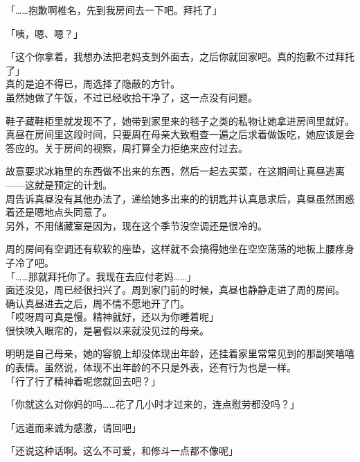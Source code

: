 「……抱歉啊椎名，先到我房间去一下吧。拜托了」

「咦，嗯、嗯？」

「这个你拿着，我想办法把老妈支到外面去，之后你就回家吧。真的抱歉不过拜托了」\\

真的是迫不得已，周选择了隐蔽的方针。\\

虽然她做了午饭，不过已经收拾干净了，这一点没有问题。

鞋子藏鞋柜里就发现不了，她带到家里来的毯子之类的私物让她拿进房间里就好。\\

真昼在房间里这段时间，只要周在母亲大致粗查一遍之后求着做饭吃，她应该是会答应的。关于房间的视察，周打算全力拒绝来应付过去。

故意要求冰箱里的东西做不出来的东西，然后一起去买菜，在这期间让真昼逃离——这就是预定的计划。\\

周告诉真昼没有其他办法了，递给她多出来的的钥匙并认真恳求后，真昼虽然困惑着还是嗯地点头同意了。\\

另外，不用储藏室是因为，现在这个季节没空调还是很冷的。

周的房间有空调还有软软的座垫，这样就不会搞得她坐在空空荡荡的地板上腰疼身子冷了吧。\\

「……那就拜托你了。我现在去应付老妈……」\\

面还没见，周已经很扫兴了。周到家门前的时候，真昼也静静走进了周的房间。\\

确认真昼进去之后，周不情不愿地开了门。\\

「哎呀周可真是慢。精神就好，还以为你睡着呢」\\

很快映入眼帘的，是暑假以来就没见过的母亲。

明明是自己母亲，她的容貌上却没体现出年龄，还挂着家里常常见到的那副笑嘻嘻的表情。虽然说，体现不出年龄的不只是外表，还有行为也是一样。\\

「行了行了精神着呢您就回去吧？」

「你就这么对你妈的吗……花了几小时才过来的，连点慰劳都没吗？」

「远道而来诚为感激，请回吧」

「还说这种话啊。这么不可爱，和修斗一点都不像呢」

